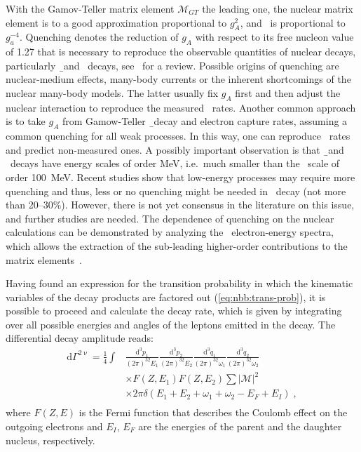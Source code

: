 With the Gamov-Teller matrix element $\mathcal{M}_{GT}$ the leading one, the
nuclear matrix element is to a good approximation proportional to $g_A^2$, and
\thalftwo\ is proportional to $g_a^{-4}$. Quenching denotes the reduction of
$g_A$ with respect to its free nucleon value of 1.27 that is necessary to
reproduce the observable quantities of nuclear decays, particularly \b\ and
\nnbb\ decays, see~\cite{Suhonen2017} for a review.  Possible origins of
quenching are nuclear-medium effects, many-body currents or the inherent
shortcomings of the nuclear many-body models. The latter usually fix $g_A$
first and then adjust the nuclear interaction to reproduce the measured \nnbb\
rates. Another common approach is to take $g_A$ from Gamow-Teller \b\ decay and
electron capture rates, assuming a common quenching for all weak processes. In
this way, one can reproduce \nnbb\ rates and predict non-measured ones. A
possibly important observation is that \b\ and \nnbb\ decays have energy scales
of order MeV, i.e.~much smaller than the \onbb\ scale of order 100~MeV. Recent
studies show that low-energy processes may require more quenching and thus,
less or no quenching might be needed in \onbb\ decay (not more than 20--30\%).
However, there is not yet consensus in the literature on this issue, and
further studies are needed. The dependence of quenching on the nuclear
calculations can be demonstrated by analyzing the \nnbb\ electron-energy
spectra, which allows the extraction of the sub-leading higher-order
contributions to the matrix elements~\cite{Gando2019}.

Having found an expression for the transition probability in which the kinematic
variables of the decay products are factored out (\cref{eq:nbb:trans-prob}), it
is possible to proceed and calculate the decay rate, which is given by
integrating over all possible energies and angles of the leptons emitted in the
decay.  The differential decay amplitude reads:
\[
  \begin{split}
    \text{d}\Gamma^{2\upnu} =
      \frac{1}{4} \int & \frac{\text{d}^3p_1}{(2\pi)^32E_1}
                         \frac{\text{d}^3p_2}{(2\pi)^32E_2}
                         \frac{\text{d}^3q_1}{(2\pi)^32\omega_1}
                         \frac{\text{d}^3q_2}{(2\pi)^32\omega_2} \\
                       & \times F(Z,E_1) F(Z,E_2) \sum |\mathcal{M}|^2 \\
                       & \times 2\pi\delta (E_1 + E_2 + \omega_1 +
                         \omega_2 - E_F + E_I) \;, \\
  \end{split}
\]
where $F(Z,E)$ is the Fermi function that describes the Coulomb effect on the
outgoing electrons and $E_I$, $E_F$ are the energies of the parent and the
daughter nucleus, respectively.

